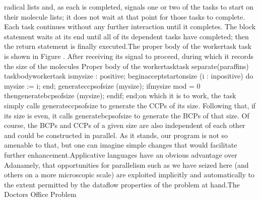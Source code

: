 radical lists and, as each is completed, signals one or two of the
tasks to start on their molecule lists; it does not wait at that point
for those tasks to complete. Each task continues without any further
interaction until it completes. The block statement waits at its end
until all of its dependent tasks have completed; then the return statement
is finally executed.\Endpara[]
\Para[]The proper body of the \tyxffmxmono[]worker\Symuns[]task%
\tyxffmxendmono[] task is shown in Figure .
After receiving its signal to proceed, during which it records the
size of the molecules
\Parbox[]
Proper body of the %
\tyxffmxmono[]worker\Symuns[]task\tyxffmxendmono[] task%
\FgEndcap[]
\Comp[]\tyxtstxbf[]separate\tyxtstxendbf[] (paraffins)
\tyxtstxbf[]task\tyxtstxendbf[] \tyxtstxbf[]body\tyxtstxendbf[] worker\Symuns[]task %
\tyxtstxbf[]is\tyxtstxendbf[]
   my\Symuns[]size : positive;
\tyxtstxbf[]begin\tyxtstxendbf[]
   \tyxtstxbf[]accept\tyxtstxendbf[] start\Symuns[]on\Symuns[]size (i : %
\tyxtstxbf[]in\tyxtstxendbf[] positive) \tyxtstxbf[]do%
\tyxtstxendbf[]
      my\Symuns[]size := i;
   \tyxtstxbf[]end\tyxtstxendbf[];
   generate\Symuns[]ccps\Symuns[]of\Symuns[]size (my\Symuns[]size);
   \tyxtstxbf[]if\tyxtstxendbf[] my\Symuns[]size \tyxtstxbf[]mod%
 = 0 \tyxtstxbf[]then\tyxtstxendbf[]
      generate\Symuns[]bcps\Symuns[]of\Symuns[]size (my\Symuns[]size);
   \tyxtstxbf[]end\tyxtstxendbf[] \tyxtstxbf[]if\tyxtstxendbf[];
\tyxtstxbf[]end\tyxtstxendbf[];\Endcomp[]
\EndParbox[]
\FgEndblock[]
 on which it is to work, the task simply calls \tyxffmxmono[]generate\Symuns[]ccps\Symuns[]of\Symuns[]size%
\tyxffmxendmono[] to generate the CCPs of its size. Following that,
if its size is even, it calls \tyxffmxmono[]generate\Symuns[]bcps\Symuns[]of\Symuns[]size%
\tyxffmxendmono[] to generate the BCPs of that size. Of course, the
BCPs and CCPs of a given size are also independent of each other and
could be constructed in parallel. As it stands, our program is not
so amenable to that, but one can imagine simple changes that would
facilitate further enhancement.\Endpara[]
\Para[]Applicative languages have an obvious advantage over Ada\EmDash[]namely,
that opportunities for parallelism such as we have seized here (and
others on a more microscopic scale) are exploited implicitly and automatically
to the extent permitted by the dataflow properties of the problem
at hand.\Endpara[]
\DivEndiv[]
\DivEndiii[]
\DivLiii[]\HdMjLiii[]The Doctor\rsquo[]s Office Problem%
